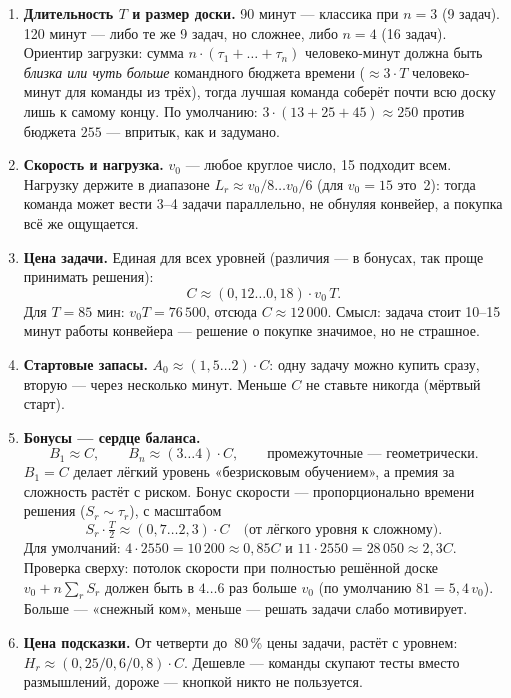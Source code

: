 \documentclass[12pt,a4paper]{article}
\newcommand{\A}{A_0}
\newcommand{\vv}{v_0}
\begin{document}
\begin{enumerate}[leftmargin=1.6em,itemsep=3pt]

\item \textbf{Длительность $T$ и размер доски.}
90 минут --- классика при $n=3$ (9 задач). 120 минут --- либо те же
9 задач, но сложнее, либо $n=4$ (16 задач). Ориентир загрузки: сумма
$n\cdot(\tau_1{+}\dots{+}\tau_n)$ человеко-минут должна быть
\emph{близка или чуть больше} командного бюджета времени
($\approx 3\cdot T$ человеко-минут для команды из трёх), тогда лучшая
команда соберёт почти всю доску лишь к самому концу. По умолчанию:
$3\cdot(13{+}25{+}45)\approx 250$ против бюджета $255$ --- впритык,
как и задумано.

\item \textbf{Скорость и нагрузка.} $\vv$ --- любое круглое число,
15 подходит всем. Нагрузку держите в диапазоне
$L_r \approx \vv/8 \dots \vv/6$ (для $\vv=15$ это~2): тогда команда
может вести 3--4 задачи параллельно, не обнуляя конвейер,
а покупка всё же ощущается.

\item \textbf{Цена задачи.} Единая для всех уровней (различия ---
в бонусах, так проще принимать решения):
\[
C \approx (0{,}12\dots0{,}18)\cdot \vv\,T .
\]
Для $T=85$ мин: $\vv T = 76\,500$, отсюда $C \approx 12\,000$.
Смысл: задача стоит 10--15 минут работы конвейера --- решение о покупке
значимое, но не страшное.

\item \textbf{Стартовые запасы.} $\A \approx (1{,}5\dots2)\cdot C$:
одну задачу можно купить сразу, вторую --- через несколько минут.
Меньше $C$ не ставьте никогда (мёртвый старт).

\item \textbf{Бонусы --- сердце баланса.}
\[
B_1 \approx C, \qquad B_n \approx (3\dots4)\cdot C,
\qquad \text{промежуточные — геометрически.}
\]
$B_1{=}C$ делает лёгкий уровень «безрисковым обучением», а премия
за сложность растёт с риском. Бонус скорости --- пропорционально
времени решения ($S_r \sim \tau_r$), с масштабом
\[
S_r \cdot \tfrac{T}{2} \approx (0{,}7 \dots 2{,}3)\cdot C
\quad\text{(от лёгкого уровня к сложному)}.
\]
Для умолчаний: $4\cdot2550=10\,200\approx0{,}85C$ и
$11\cdot2550=28\,050\approx2{,}3C$. Проверка сверху: потолок скорости
при полностью решённой доске $\vv + n\sum_r S_r$ должен быть
в $4\dots6$ раз больше $\vv$ (по умолчанию $81 = 5{,}4\,\vv$).
Больше --- «снежный ком», меньше --- решать задачи слабо мотивирует.

\item \textbf{Цена подсказки.} От четверти до~80\,\% цены задачи,
растёт с уровнем: $H_r \approx (0{,}25 / 0{,}6 / 0{,}8)\cdot C$.
Дешевле --- команды скупают тесты вместо размышлений, дороже ---
кнопкой никто не пользуется.

\end{enumerate}
\end{document}
